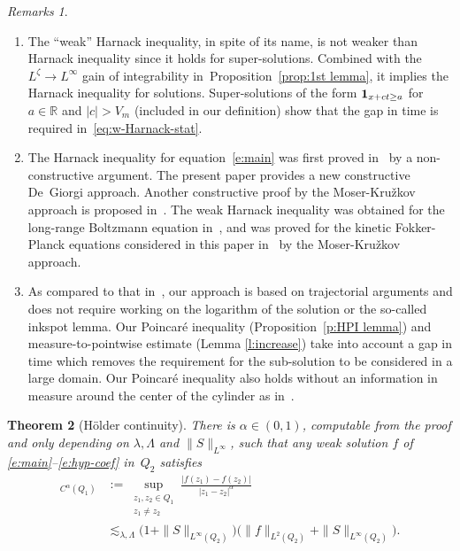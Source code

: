 \documentclass[JEP,XML,SOM,Unicode,NoFloatCountersInSection,published]{cedram}
\newtheorem{theorem}{Theorem}
\theoremstyle{definition}
\theoremstyle{remark}
\newtheorem{remarks}[theorem]{Remarks}
\begin{document}
\skpt
\begin{remarks}
\begin{enumerate}
\item The ``weak'' Harnack inequality, in spite of its name, is
not weaker than Harnack inequality since it holds for
super-solutions. Combined with the $L^{\zeta} \to L^\infty$
gain of integrability in~Proposition~\ref{prop:1st lemma}, it
implies the Harnack inequality for solutions. Super-solutions
of the form ${\bf 1}_{x+ct\ge a}$ for $a\in \mathbb{R}$ and
$|c|>V_m$ (included in our definition) show that the gap in
time is required in~\eqref{eq:w-Harnack-stat}.
\item The Harnack inequality for equation~\eqref{e:main} was
first proved in~\cite{gimv} by a non-constructive argument. The
present paper provides a new constructive De~Giorgi
approach. Another constructive proof by the Moser-Kru\v{z}kov
approach is proposed in~\cite{Guerand-Imbert}. The weak Harnack
inequality was obtained for the long-range Boltzmann equation
in~\cite{MR4049224}, and was proved for the kinetic
Fokker-Planck equations considered in this paper
in~\cite{Guerand-Imbert} by the Moser-Kru\v{z}kov approach.
\item As compared to that in~\cite{Guerand-Imbert}, our approach
is based on trajectorial arguments and does not require working
on the logarithm of the solution or the so-called inkspot
lemma. Our Poincaré inequality (Proposition~\ref{p:HPI
lemma}) and measure-to-pointwise estimate (Lemma
\ref{l:increase}) take into account a gap in time which removes
the requirement for the sub-solution to be considered in a
large domain. Our Poincaré inequality also holds without an
information in measure around the center of the cylinder as
in~\cite{Guerand-Imbert}.
\end{enumerate}
\end{remarks}

\begin{theorem}[Hölder continuity]
\label{t:holder}
There is $\alpha \in (0,1)$, computable from the proof and only
depending on $\lambda, \Lambda$ and $\|S\|_{L^{\infty}}$, such
that any weak solution $f$ of \eqref{e:main}--\eqref{e:hyp-coef}
in~$Q_2$ satisfies\vspace*{-3pt}
\begin{align*}
[f]_{C^\alpha (Q_{1})}
& := \sup_{\substack{z_1,z_2 \in Q_1\\ z_1 \not =
z_2}} \frac{|f(z_1) - f(z_2)|}{|z_1-z_2|^{\alpha}} \\
& \lesssim_{\lambda,\Lambda}
\bigl(1+\|S\|_{L^\infty(Q_2)} \bigr)
\bigl( \|f\|_{L^2 (Q_2)} + \|S\|_{L^\infty(Q_2)} \bigr).
\end{align*}
\end{theorem}
\end{document}
